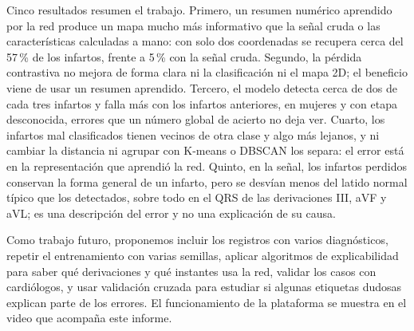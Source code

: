 \documentclass[conference]{IEEEtran}
\begin{document}
Cinco resultados resumen el trabajo. Primero, un resumen numérico aprendido por la red produce un mapa mucho más informativo que la señal cruda o las características calculadas a mano: con solo dos coordenadas se recupera cerca del 57\,\% de los infartos, frente a 5\,\% con la señal cruda. Segundo, la pérdida contrastiva no mejora de forma clara ni la clasificación ni el mapa 2D; el beneficio viene de usar un resumen aprendido. Tercero, el modelo detecta cerca de dos de cada tres infartos y falla más con los infartos anteriores, en mujeres y con etapa desconocida, errores que un número global de acierto no deja ver. Cuarto, los infartos mal clasificados tienen vecinos de otra clase y algo más lejanos, y ni cambiar la distancia ni agrupar con K-means o DBSCAN los separa: el error está en la representación que aprendió la red. Quinto, en la señal, los infartos perdidos conservan la forma general de un infarto, pero se desvían menos del latido normal típico que los detectados, sobre todo en el QRS de las derivaciones III, aVF y aVL; es una descripción del error y no una explicación de su causa.

Como trabajo futuro, proponemos incluir los registros con varios diagnósticos, repetir el entrenamiento con varias semillas, aplicar algoritmos de explicabilidad para saber qué derivaciones y qué instantes usa la red, validar los casos con cardiólogos, y usar validación cruzada para estudiar si algunas etiquetas dudosas explican parte de los errores. El funcionamiento de la plataforma se muestra en el video que acompaña este informe.
\end{document}
